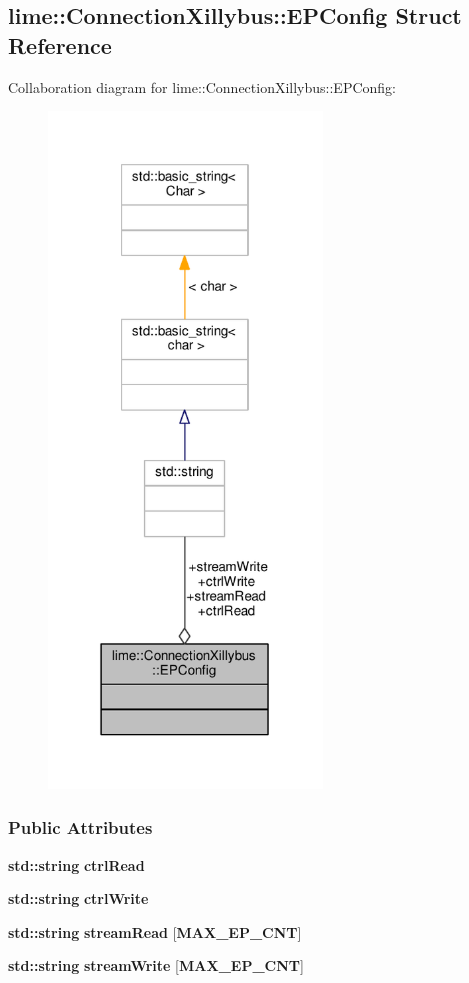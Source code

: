 \subsection{lime\+:\+:Connection\+Xillybus\+:\+:E\+P\+Config Struct Reference}
\label{structlime_1_1ConnectionXillybus_1_1EPConfig}


Collaboration diagram for lime\+:\+:Connection\+Xillybus\+:\+:E\+P\+Config\+:
\nopagebreak
\begin{figure}[H]
\begin{center}
\leavevmode
\includegraphics[width=206pt]{d8/d20/structlime_1_1ConnectionXillybus_1_1EPConfig__coll__graph}
\end{center}
\end{figure}
\subsubsection*{Public Attributes}
\begin{DoxyCompactItemize}
\item 
{\bf std\+::string} {\bf ctrl\+Read}
\item 
{\bf std\+::string} {\bf ctrl\+Write}
\item 
{\bf std\+::string} {\bf stream\+Read} [{\bf M\+A\+X\+\_\+\+E\+P\+\_\+\+C\+NT}]
\item 
{\bf std\+::string} {\bf stream\+Write} [{\bf M\+A\+X\+\_\+\+E\+P\+\_\+\+C\+NT}]
\end{DoxyCompactItemize}


